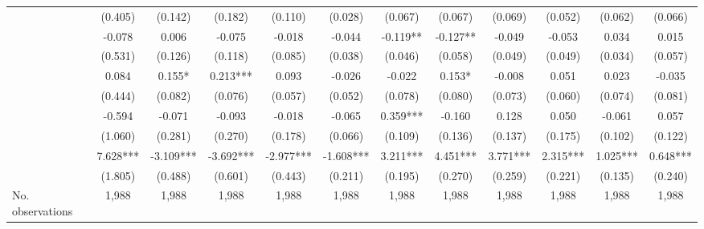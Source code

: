 \begin{table}
\begin{threeparttable}
\begin{tabular}{p{4cm}S@{}S@{}S@{}S@{}S@{}S@{}S@{}S@{}S@{}S@{}S@{}}
                                          &     (0.405)   &     (0.142)   &     (0.182)   &     (0.110)   &     (0.028)   &     (0.067)   &     (0.067)   &     (0.069)   &     (0.052)   &     (0.062)   &     (0.066)   \\
                        &      -0.078   &       0.006   &      -0.075   &      -0.018   &      -0.044   &      -0.119** &      -0.127** &      -0.049   &      -0.053   &       0.034   &       0.015   \\
                                          &     (0.531)   &     (0.126)   &     (0.118)   &     (0.085)   &     (0.038)   &     (0.046)   &     (0.058)   &     (0.049)   &     (0.049)   &     (0.034)   &     (0.057)   \\
                     &       0.084   &       0.155*  &       0.213***&       0.093   &      -0.026   &      -0.022   &       0.153*  &      -0.008   &       0.051   &       0.023   &      -0.035   \\
                                          &     (0.444)   &     (0.082)   &     (0.076)   &     (0.057)   &     (0.052)   &     (0.078)   &     (0.080)   &     (0.073)   &     (0.060)   &     (0.074)   &     (0.081)   \\
                         &      -0.594   &      -0.071   &      -0.093   &      -0.018   &      -0.065   &       0.359***&      -0.160   &       0.128   &       0.050   &      -0.061   &       0.057   \\
                                          &     (1.060)   &     (0.281)   &     (0.270)   &     (0.178)   &     (0.066)   &     (0.109)   &     (0.136)   &     (0.137)   &     (0.175)   &     (0.102)   &     (0.122)   \\
                      &       7.628***&      -3.109***&      -3.692***&      -2.977***&      -1.608***&       3.211***&       4.451***&       3.771***&       2.315***&       1.025***&       0.648***\\
                                          &     (1.805)   &     (0.488)   &     (0.601)   &     (0.443)   &     (0.211)   &     (0.195)   &     (0.270)   &     (0.259)   &     (0.221)   &     (0.135)   &     (0.240)   \\
            \midrule
            No. observations              &       1,988   &       1,988   &       1,988   &       1,988   &       1,988   &       1,988   &       1,988   &       1,988   &       1,988   &       1,988   &       1,988   \\

\end{tabular}
\end{threeparttable}
\end{table}
